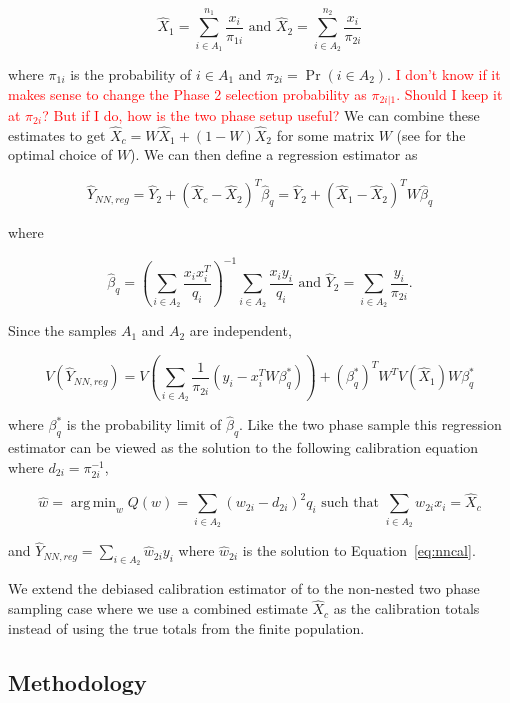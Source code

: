 \documentclass[12pt]{article}
\DeclareMathOperator*{\argmin}{arg\,min}
\begin{document}
$$\hat X_1 = \sum_{i \in A_1}^{n_1} \frac{x_i}{\pi_{1i}} \text{ and } 
\hat X_2 = \sum_{i \in A_2}^{n_2} \frac{x_i}{\pi_{2i}}$$

where $\pi_{1i}$ is the probability of $i \in A_1$ and $\pi_{2i} = \Pr(i \in
A_2)$. \textcolor{red}{I don't know if it makes sense to change the Phase 2
selection probability as $\pi_{2i|1}$. Should I keep it at $\pi_{2i}$? But if
I do, how is the two phase setup useful?} We can combine these estimates to get
$\hat X_c = W \hat X_1 + (1 - W)\hat X_2$ for some matrix $W$ (see
\cite{merkouris2004combining} for the optimal choice of $W$). We can then define
a regression estimator as

$$
\hat Y_{NN, reg} = \hat Y_2 + (\hat X_c - \hat X_2)^T \hat \beta_q = 
\hat Y_2 + (\hat X_1 - \hat X_2)^T W\hat \beta_q 
$$

where 

$$\hat \beta_q = \left(\sum_{i \in A_2} \frac{x_i x_i^T}{q_i}\right)^{-1}
\sum_{i \in A_2} \frac{x_i y_i}{q_i} \text{ and }\hat Y_2 = \sum_{i \in A_2}
\frac{y_i}{\pi_{2i}}.$$

Since the samples $A_1$ and $A_2$ are independent, 

$$V(\hat Y_{NN, reg}) = V\left(\sum_{i \in A_2} \frac{1}{\pi_{2i}}(y_i -
x_i^TW\beta^*_q)\right) + (\beta^*_q)^T W^T V(\hat X_1) W \beta_q^*$$

where $\beta_q^*$ is the probability limit of $\hat \beta_q$. Like the two phase
sample this regression estimator can be viewed as the solution to the following
calibration equation where $d_{2i} = \pi_{2i}^{-1}$,

\begin{equation}\label{eq:nncal}
\hat w = \argmin_w Q(w) = \sum_{i \in A_2} (w_{2i} - d_{2i})^2 q_i \text{ such
that } \sum_{i \in A_2} w_{2i} x_i = \hat X_c
\end{equation}

and $\hat Y_{NN, reg} = \sum_{i \in A_2} \hat w_{2i} y_i$ where $\hat
w_{2i}$ is the solution to Equation~\ref{eq:nncal}.

We extend the debiased calibration estimator of \cite{kwon2024debiased} to the
non-nested two phase sampling case where we use a combined estimate $\hat X_c$
as the calibration totals instead of using the true totals from the finite
population.

\subsection{Methodology}
\end{document}
